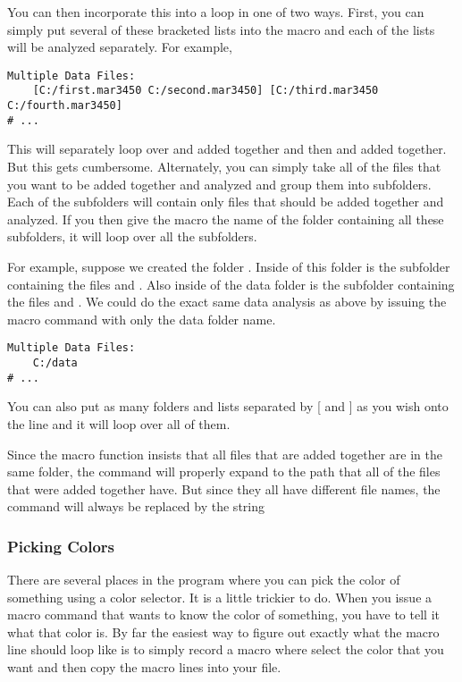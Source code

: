 You can then incorporate this into a loop in
one of two ways. First, you can simply put several
of these bracketed lists into the macro and each
of the lists will be analyzed separately. For example,
\begin{lstlisting}[caption={'Loop Over the Analysis'}]
Multiple Data Files:
    [C:/first.mar3450 C:/second.mar3450] [C:/third.mar3450 C:/fourth.mar3450]
# ...
\end{lstlisting}
This will separately loop over  
and  added together and then 
 and 
added together. But this gets cumbersome. Alternately,
you can simply take all of the files that you want to be 
added together and analyzed and group them into subfolders. 
Each of the subfolders will contain only files that should
be added together and analyzed. If you then give the
macro the name of the folder containing all these subfolders,
it will loop over all the subfolders. 

For example, suppose we created the folder .
Inside of this folder is the subfolder 
containing the files  and 
. Also inside of the data folder
is the subfolder  containing the files
 and .
We could do the exact same data analysis as above by 
issuing the macro command with only the data folder name.
\begin{lstlisting}[caption={'Use the Folder Syntax'}]
Multiple Data Files:
    C:/data
# ...
\end{lstlisting}
You can also put as many folders and lists separated
by [ and ] as you wish onto the line and it will loop
over all of them.

Since the macro function insists that all files 
that are added together are in the same folder,
the  command will properly expand 
to the path that all of the files that were added 
together have. But since they all have different file 
names, the  command will always be 
replaced by the string 

\subsubsection{Picking Colors}

There are several places in the program where you can
pick the color of something using a color selector.
It is a little trickier to do.  When you issue a macro 
command that wants to know the color of something, you 
have to tell it what that color is. By far the easiest
way to figure out exactly what the macro line should
loop like is to simply record a macro where select
the color that you want and then copy the macro lines
into your file.

